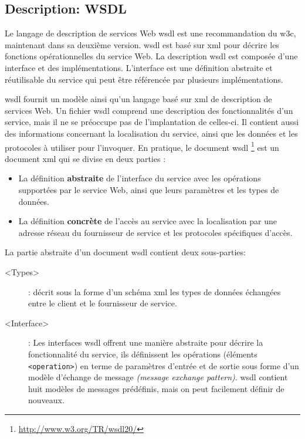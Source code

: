   \subsection{Description: WSDL}
  \label{sec:wsdl}
  Le langage de description de services Web \acrshort{wsdl}
  \cite{christensen2001web, chinnici2007web} est une recommandation du
  \acrshort{w3c}, maintenant dans sa deuxième version.
  \acrshort{wsdl} est basé sur \acrshort{xml} pour décrire les
  fonctions opérationnelles du service Web. La description
  \acrshort{wsdl} est composée d'une interface et des
  implémentations. L'interface est une définition abstraite et
  réutilisable du service qui peut être référencée par plusieurs
  implémentations.\medskip

  \acrshort{wsdl} fournit un modèle ainsi qu'un langage basé sur
  \acrshort{xml} de description de services Web. Un fichier
  \acrshort{wsdl} comprend une description des fonctionnalités d'un
  service, mais il ne se préoccupe pas de l'implantation de celles-ci.
  Il contient aussi des informations concernant la localisation du
  service, ainsi que les données et les protocoles à utiliser pour
  l'invoquer. En pratique, le document \acrshort{wsdl}
  \footnote{\url{http://www.w3.org/TR/wsdl20/}} est un document
  \acrshort{xml} qui se divise en deux parties
  \cite{elie2010}:\medskip

  \medskip

  \SpecialItem
  \begin{itemize}
  \item La définition \textbf{abstraite} de l'interface du service
    avec les opérations supportées par le service Web, ainsi que leurs
    paramètres et les types de données.

  \item La définition \textbf{concrète} de l'accès au service avec la
    localisation par une adresse réseau du fournisseur de service et
    les protocoles spécifiques d'accès.\medskip
  \end{itemize}
  \enddescription

  La partie abstraite d'un document \acrshort{wsdl} contient deux
  sous-parties:\medskip

  \renewcommand{\descriptionlabel}[1]{\hspace{0.5cm}\textbullet~\texttt{#1}}
  \begin{description}
  \item[<Types>]: décrit sous la forme d'un schéma \acrshort{xml} les
    types de données échangées entre le client et le fournisseur de
    service.

  \item[<Interface>]: Les interfaces \acrshort{wsdl} offrent une
    manière abstraite pour décrire la fonctionnalité du service, ils 
    définissent les opérations (éléments \texttt{<operation>}) en terme de
    paramètres d'entrée et de sortie sous forme d'un modèle
    d'échange de message \textit{(message exchange
      pattern)}. \acrshort{wsdl} contient huit modèles de messages
    prédéfinis, mais on peut facilement définir de nouveaux.\medskip
  \end{description}
  \enddescription

